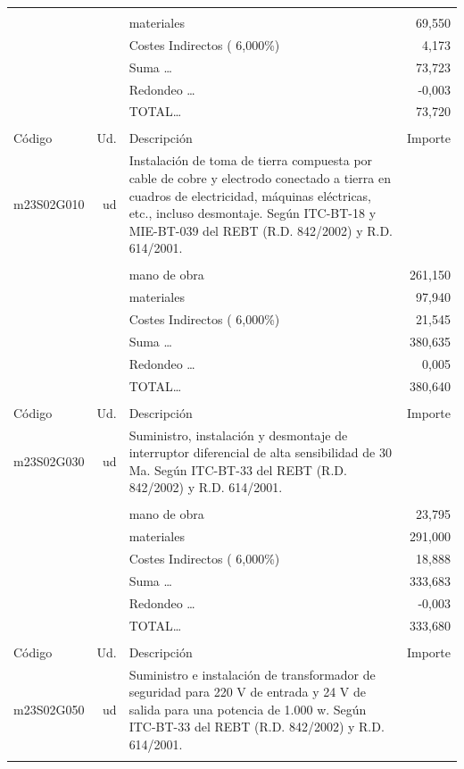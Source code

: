 \begin{supertabular}{l r p{60mm} r}
&&&\\%
&&materiales&    69,550\\%
&&Costes Indirectos (     6,000\%)&     4,173\\%
&&Suma \ldots&    73,723\\%
&&Redondeo \ldots&    {-}0,003\\%
%
&&TOTAL\ldots&    73,720\\%
&&&\\%
Código&Ud.&Descripción&Importe\\%
\hline%
m23S02G010&ud&Instalación de toma de tierra compuesta por cable de cobre y electrodo conectado a tierra en cuadros de electricidad, máquinas eléctricas, etc., incluso desmontaje. Según ITC{-}BT{-}18 y MIE{-}BT{-}039 del REBT (R.D. 842/2002) y R.D. 614/2001.&\\%
&&&\\%
&&mano de obra&   261,150\\%
&&materiales&    97,940\\%
&&Costes Indirectos (     6,000\%)&    21,545\\%
&&Suma \ldots&   380,635\\%
&&Redondeo \ldots&     0,005\\%
%
&&TOTAL\ldots&   380,640\\%
&&&\\%
Código&Ud.&Descripción&Importe\\%
\hline%
m23S02G030&ud&Suministro, instalación y desmontaje de interruptor diferencial de alta sensibilidad de 30 Ma. Según ITC{-}BT{-}33 del REBT (R.D. 842/2002) y R.D. 614/2001.&\\%
&&&\\%
&&mano de obra&    23,795\\%
&&materiales&   291,000\\%
&&Costes Indirectos (     6,000\%)&    18,888\\%
&&Suma \ldots&   333,683\\%
&&Redondeo \ldots&    {-}0,003\\%
%
&&TOTAL\ldots&   333,680\\%
&&&\\%
Código&Ud.&Descripción&Importe\\%
\hline%
m23S02G050&ud&Suministro e instalación de transformador de seguridad para 220 V de entrada y 24 V de salida para una potencia de 1.000 w. Según ITC{-}BT{-}33 del REBT (R.D. 842/2002) y R.D. 614/2001.&\\%
&&&\\%

\end{supertabular}
